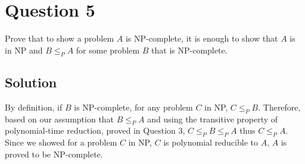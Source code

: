 
\section*{Question 5}

Prove that to show a problem $A$ is NP-complete, it is enough to show that $A$ is in NP and $B \leq_P A$ for some problem $B$ that is NP-complete.

\subsection*{Solution}

By definition, if $B$ is NP-complete, for any problem $C$ in NP, $C \leq_P B$.
Therefore, based on our assumption that $B \leq_P A$ and using the transitive property of polynomial-time reduction, proved in Question 3, $C \leq_P B \leq_P A$ thus $C \leq_P A$.
Since we showed for a problem $C$ in NP, $C$ is polynomial reducible to $A$, $A$ is proved to be NP-complete.
